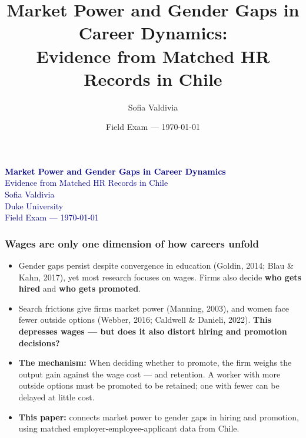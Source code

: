 \documentclass[aspectratio=169, 11pt]{beamer}
\title{Market Power and Gender Gaps in Career Dynamics:\\Evidence from Matched HR Records in Chile}
\author{Sofia Valdivia}
\institute{Duke University}
\date{Field Exam --- \today}
\newcommand{\bmark}[1]{\textcolor{midblue}{\textbf{#1}}}
\begin{document}
{
\begin{frame}[plain]
\vfill
\begin{center}
{\Large\bfseries\textcolor{navy}{Market Power and Gender Gaps in Career Dynamics}}\\[6pt]
{\large\textcolor{navy}{Evidence from Matched HR Records in Chile}}\\[20pt]
{\normalsize\textcolor{navy}{Sofia Valdivia}}\\[4pt]
{\small\textcolor{navy}{Duke University}}\\[16pt]
{\small\textcolor{navy}{Field Exam --- \today}}
\end{center}
\vfill
\end{frame}
}


\begin{frame}
\frametitle{Wages are only one dimension of how careers unfold}

\begin{itemize}
    \item Gender gaps persist despite convergence in education {\scriptsize\textcolor{muted}{(Goldin, 2014; Blau \& Kahn, 2017)}}, yet most research focuses on wages. Firms also decide \textbf{who gets hired} and \textbf{who gets promoted}.

    \medskip
    \item Search frictions give firms market power {\scriptsize\textcolor{muted}{(Manning, 2003)}}, and women face fewer outside options {\scriptsize\textcolor{muted}{(Webber, 2016; Caldwell \& Danieli, 2022)}}. \bmark{This depresses wages --- but does it also distort hiring and promotion decisions?}

    \medskip
    \item \textbf{The mechanism:} When deciding whether to promote, the firm weighs the output gain against the wage cost --- and retention. A worker with more outside options must be promoted to be retained; one with fewer can be delayed at little cost.

    \medskip
    \item \textbf{This paper:} connects market power to gender gaps in hiring and promotion, using matched employer-employee-applicant data from Chile.
\end{itemize}

\end{frame}
\end{document}
